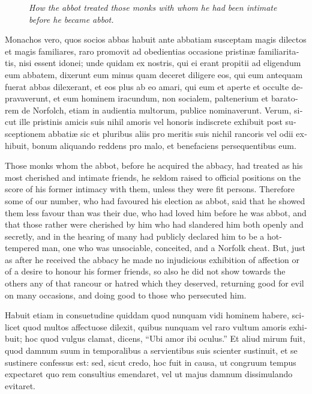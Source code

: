 \documentclass{book}
\newcommand{\blockhead}[4][]{
\begin{figure}
\centering
\vspace{#4}
\parbox{2.75cm}{\begin{center}\footnotesize \color{BrickRed} \emph{#2}\\ #1 \end{center}}
\end{figure}
}
\begin{document}
\begin{paracol}{2}
\switchcolumn*

\begin{otherlanguage}{latin}
\blockhead{How the abbot treated those monks with whom he had been intimate before he became abbot.}{4}{-0.65cm}
Monachos vero, quos socios abbas habuit ante abbatiam susceptam magis dilectos et magis familiares, raro promovit ad obedientias occasione pristin\ae{} familiaritatis, nisi essent idonei; unde quidam ex nostris, qui ei erant propitii ad eligendum eum abbatem, dixerunt eum minus quam deceret diligere eos, qui eum antequam fuerat abbas dilexerant, et eos plus ab eo amari, qui eum et aperte et occulte depravaverunt, et eum hominem iracundum, non socialem, paltenerium et baratorem de Norfolch, etiam in audientia multorum, publice nominaverunt. Verum, sicut ille pristinis amicis suis nihil amoris vel honoris indiscrete exhibuit post susceptionem abbati\ae{} sic et pluribus aliis pro meritis suis nichil rancoris vel odii exhibuit, bonum aliquando reddens pro malo, et benefaciens persequentibus eum.

\end{otherlanguage}

\switchcolumn

Those monks whom the abbot, before he acquired the abbacy, had treated as his most cherished and intimate friends, he seldom raised to official positions on the score of his former intimacy with them, unless they were fit persons. Therefore some of our number, who had favoured his election as abbot, said that he showed them less favour than was their due, who had loved him before he was abbot, and that those rather were cherished by him who had slandered him both openly and secretly, and in the hearing of many had publicly declared him to be a hot-tempered man, one who was unsociable, conceited, and a Norfolk cheat. But, just as after he received the abbacy he made no injudicious exhibition of affection or of a desire to honour his former friends, so also he did not show towards the others any of that rancour or hatred which they deserved, returning good for evil on many occasions, and doing good to those who persecuted him.

\switchcolumn*

\begin{otherlanguage}{latin}
Habuit etiam in consuetudine quiddam quod nunquam vidi hominem habere, scilicet quod multos affectuose dilexit, quibus nunquam vel raro vultum amoris exhibuit; hoc quod vulgus clamat, dicens, ``Ubi amor ibi oculus.'' Et aliud mirum fuit, quod damnum suum in temporalibus a servientibus suis scienter sustinuit, et se sustinere confessus est: sed, sicut credo, hoc fuit in causa, ut congruum tempus expectaret quo rem consultius emendaret, vel ut majus damnum dissimulando evitaret.
\end{otherlanguage}


\end{paracol}
\end{document}
